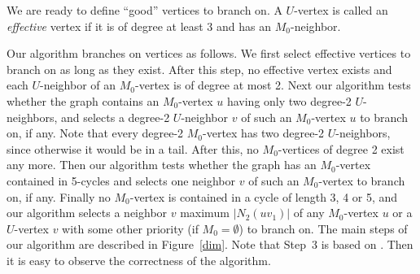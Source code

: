 \documentclass{elsart_TR2}
\begin{document}
We are ready to define ``good'' vertices to branch on.
A $U$-vertex  is called an \emph{effective} vertex if it is of degree at least 3 and has an $M_0$-neighbor.


Our algorithm branches on vertices as follows.
We first select effective vertices to branch on as long as they exist.
After this step, no effective vertex exists and each $U$-neighbor of an $M_0$-vertex is of degree at most 2.
Next our algorithm tests whether the graph contains an $M_0$-vertex $u$
having only two degree-2 $U$-neighbors,
and selects a degree-2 $U$-neighbor $v$ of such an $M_0$-vertex $u$ to branch on, if any.
Note that every degree-2 $M_0$-vertex has two degree-2 $U$-neighbors, since otherwise it would be in a tail.
After this, no $M_0$-vertices of degree 2 exist  any more.
Then our algorithm tests whether the graph has an $M_0$-vertex contained in 5-cycles
 and selects one neighbor $v$ of such an $M_0$-vertex to branch on, if any.
Finally no $M_0$-vertex is contained in a cycle of length 3, 4 or 5,
and our algorithm selects a neighbor $v$ maximum $|N_2(uv_1)|$ of any $M_0$-vertex $u$ or
a $U$-vertex $v$ with some other priority (if $M_0=\emptyset$) to branch on.
The main steps of our algorithm are described in Figure~\ref{dim}.
Note that Step~3 is based on .
Then it is easy to observe the correctness of the algorithm.
\end{document}
